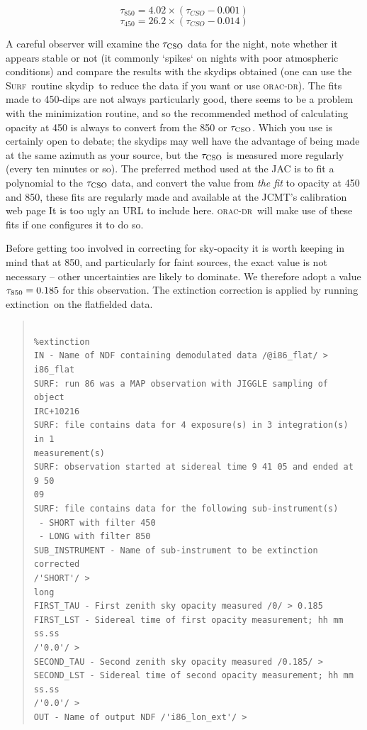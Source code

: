 \documentclass[twoside,11pt]{article}
\newenvironment{myquote}{\begin{quote}\begin{small}}{\end{small}\end{quote}}
\newcommand{\surf}{\xref{\textsc{Surf}}{sun216}{}}
\newcommand{\oracdr}{\xref{\textsc{orac-dr}}{sun231}{}}
\newcommand{\task}[1]{\textsf{#1}}
\newcommand{\skydip}{\xref{\task{skydip}}{sun216}{SKYDIP}}
\newcommand{\ext}{\xref{\task{extinction}}{sun216}{EXTINCTION}}
\newcommand{\htmladdnormallink}[2]{#1}
\newcommand{\xref}[3]{#1}
\renewcommand{\_}{\texttt{\symbol{95}}}
\begin{document}
\begin{equation}
\tau_{850} = 4.02 \times (\tau_{CSO} - 0.001)
\end{equation}
\begin{equation}
\tau_{450} = 26.2 \times (\tau_{CSO} - 0.014)
\end{equation}

A careful observer will examine the $\tau_{\rm CSO}$ data for the
night, note whether it appears stable or not (it commonly `spikes` on
nights with poor atmospheric conditions) and compare the results with
the skydips obtained (one can use the \surf\ routine \skydip\ to reduce
the data if you want or use \oracdr).  The fits made to 450-dips are
not always particularly good, there seems to be a problem with the
minimization routine, and so the recommended method of calculating
opacity at 450 is always to convert from the 850 or $\tau_{\rm CSO}$. 
Which you use is certainly open to debate; the skydips may well have
the advantage of being made at the same azimuth as your source, but
the $\tau_{\rm CSO}$ is measured more regularly (every ten minutes or
so).  The preferred method used at the JAC is to fit a polynomial to
the $\tau_{\rm CSO}$ data, and convert the value from {\it the fit} to
opacity at 450 and 850, these fits are regularly made and available at
\htmladdnormallink{the JCMT's calibration web page}
{http://www.jach.hawaii.edu/JACpublic/JCMT/Continuum_observing/SCUBA/astronomy/calibration/fitscover.html}
It is too ugly an URL to include here. \oracdr\ will make use of these 
fits if one configures it to do so.

Before getting too involved in correcting for sky-opacity it is worth
keeping in mind that at 850, and particularly for faint sources, the
exact value is not necessary -- other uncertainties are likely to
dominate. We therefore adopt a value $\tau_{\rm 850}=0.185$ for this
observation. The extinction correction is applied by running \ext\ on
the flatfielded data.

\begin{myquote}
\begin{verbatim}

%extinction
IN - Name of NDF containing demodulated data /@i86_flat/ > i86_flat
SURF: run 86 was a MAP observation with JIGGLE sampling of object 
IRC+10216
SURF: file contains data for 4 exposure(s) in 3 integration(s) in 1
measurement(s)
SURF: observation started at sidereal time 9 41 05 and ended at 9 50 
09
SURF: file contains data for the following sub-instrument(s)
 - SHORT with filter 450
 - LONG with filter 850
SUB_INSTRUMENT - Name of sub-instrument to be extinction corrected 
/'SHORT'/ > 
long
FIRST_TAU - First zenith sky opacity measured /0/ > 0.185
FIRST_LST - Sidereal time of first opacity measurement; hh mm ss.ss 
/'0.0'/ > 
SECOND_TAU - Second zenith sky opacity measured /0.185/ > 
SECOND_LST - Sidereal time of second opacity measurement; hh mm ss.ss 
/'0.0'/ > 
OUT - Name of output NDF /'i86_lon_ext'/ >
\end{verbatim}
\end{myquote}
\end{document}

